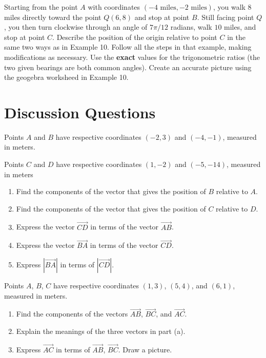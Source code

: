 \documentclass{ximera}
\begin{document}
\begin{question}  \label{Qgtsygh:Vectors}
Starting from the point $A$ with coordinates $(-4 \text{ miles},-2 \text{ miles})$, you walk $8$ miles directly toward the point $Q(6,8)$ and stop at point $B$. Still facing point $Q$, you then turn clockwise through an angle of $7\pi/12$ radians, walk $10$ miles, and stop at point $C$. Describe the position of the origin relative to point $C$ in the same two ways as in Example 10. Follow all the steps in that example, making modifications as necessary. Use the {\bf exact} values for the trigonometric ratios (the two given bearings are both common angles).  Create an accurate picture using the geogebra worksheed in Example 10.


\end{question}

\section{Discussion Questions}

\begin{question}  \label{QPoDfdlLDCZXZ}
Points $A$ and $B$ have respective coordinates $(-2,3)$ and $(-4,-1)$, measured in meters.

Points $C$ and $D$ have respective coordinates $(1,-2)$ and $(-5,-14)$, measured in meters

\begin{enumerate}
\item Find the components of the vector that gives the position of $B$ relative to $A$.

\item Find the components of the vector that gives the position of $C$ relative to $D$.

\item Express the vector $\overrightarrow{CD}$ in terms of the vector $\overrightarrow{AB}$.

\item Express the vector $\overrightarrow{BA}$ in terms of the vector $\overrightarrow{CD}$.

\item Express $|\overrightarrow{BA}|$ in terms of $|\overrightarrow{CD}|$.
\end{enumerate}
\end{question}


\begin{question}  \label{QMNDVBed43}
Points $A$, $B$, $C$ have respective coordinates $(1,3)$, $(5,4)$, and $(6,1)$, measured in meters.
\begin{enumerate}
\item Find the components of the vectors $\overrightarrow{AB}$, $\overrightarrow{BC}$, and $\overrightarrow{AC}$.

\item Explain the meanings of the three vectors in part (a).

\item Express $\overrightarrow{AC}$ in terms of $\overrightarrow{AB}$, $\overrightarrow{BC}$. Draw a picture.
\end{enumerate}

\end{question}
\end{document}
